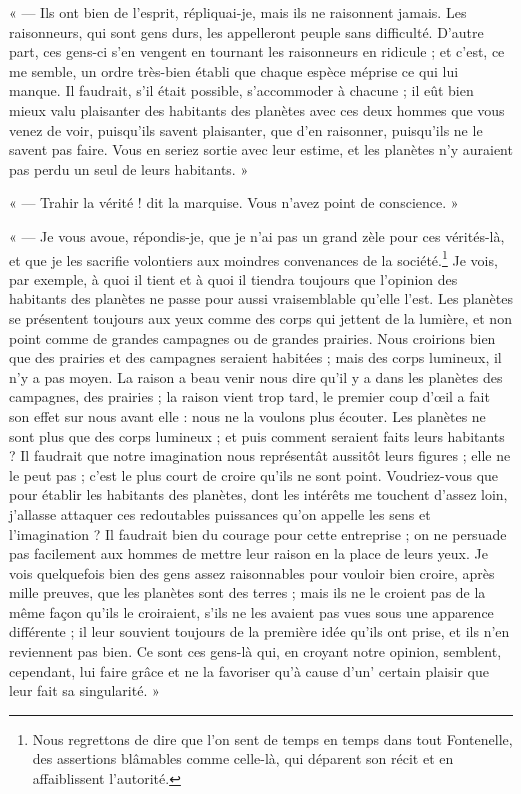 \documentclass[a4paper, 11pt, oneside]{article}
\begin{document}
« --- Ils ont bien de l'esprit, répliquai-je, mais ils ne raisonnent jamais. Les raisonneurs, qui sont gens durs, les appelleront peuple sans difficulté. D'autre part, ces gens-ci s'en vengent en tournant les raisonneurs en ridicule ; et c'est, ce me semble, un ordre très-bien établi que chaque espèce méprise ce qui lui manque. Il faudrait, s'il était possible, s'accommoder à chacune ; il eût bien mieux valu plaisanter des habitants des planètes avec ces deux hommes que vous venez de voir, puisqu'ils savent plaisanter, que d'en raisonner, puisqu'ils ne le savent pas faire. Vous en seriez sortie avec leur estime, et les planètes n'y auraient pas perdu un seul de leurs habitants. »

« --- Trahir la vérité ! dit la marquise. Vous n'avez point de conscience. »

« --- Je vous avoue, répondis-je, que je n'ai pas un grand zèle pour ces vérités-là, et que je les sacrifie volontiers aux moindres convenances de la société.\footnote{Nous regrettons de dire que l'on sent de temps en temps dans tout Fontenelle, des assertions blâmables comme celle-là, qui déparent son récit et en affaiblissent l'autorité.} Je vois, par exemple, à quoi il tient et à quoi il tiendra toujours que l'opinion des habitants des planètes ne passe pour aussi vraisemblable qu'elle l'est. Les planètes se présentent toujours aux yeux comme des corps qui jettent de la lumière, et non point comme de grandes campagnes ou de grandes prairies. Nous croirions bien que des prairies et des campagnes seraient habitées ; mais des corps lumineux, il n'y a pas moyen. La raison a beau venir nous dire qu'il y a dans les planètes des campagnes, des prairies ; la raison vient trop tard, le premier coup d'œil a fait son effet sur nous avant elle : nous ne la voulons plus écouter. Les planètes ne sont plus que des corps lumineux ; et puis comment seraient faits leurs habitants ? Il faudrait que notre imagination nous représentât aussitôt leurs figures ; elle ne le peut pas ; c'est le plus court de croire qu'ils ne sont point. Voudriez-vous que pour établir les habitants des planètes, dont les intérêts me touchent d'assez loin, j'allasse attaquer ces redoutables puissances qu'on appelle les sens et l'imagination ? Il faudrait bien du courage pour cette entreprise ; on ne persuade pas facilement aux hommes de mettre leur raison en la place de leurs yeux. Je vois quelquefois bien des gens assez raisonnables pour vouloir bien croire, après mille preuves, que les planètes sont des terres ; mais ils ne le croient pas de la même façon qu'ils le croiraient, s'ils ne les avaient pas vues sous une apparence différente ; il leur souvient toujours de la première idée qu'ils ont prise, et ils n'en reviennent pas bien. Ce sont ces gens-là qui, en croyant notre opinion, semblent, cependant, lui faire grâce et ne la favoriser qu'à cause d'un' certain plaisir que leur fait sa singularité. »
\end{document}

